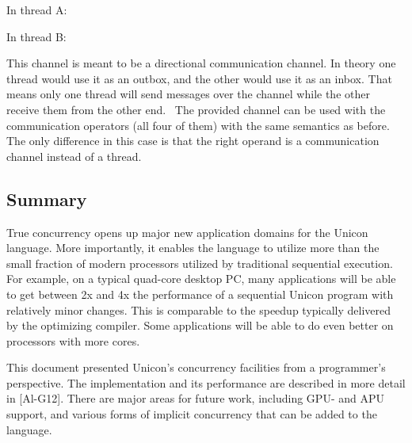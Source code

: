 In thread A:


In thread B:


This channel is meant to be a directional communication channel. In
theory one thread would use it as an outbox, and the other would use it
as an inbox. That means only one thread will send messages over the
channel while the other receive them from the other end. \ The provided
channel can be used with the communication operators (all four of them)
with the same semantics as before. The only difference in this case is
that the right operand is a communication channel instead of a thread.



\subsection*{Summary}

True concurrency opens up major new application domains for the Unicon
language. More importantly, it enables the language to utilize more
than the small fraction of modern processors utilized by traditional
sequential execution. For example, on a typical quad-core desktop PC,
many applications will be able to get between 2x and 4x the performance
of a sequential Unicon program with relatively minor changes. This is
comparable to the speedup typically delivered by the optimizing
compiler. Some applications will be able to do even better on
processors with more cores.

This document presented Unicon{\textquoteright}s concurrency facilities
from a programmer{\textquoteright}s perspective. The implementation and
its performance are described in more detail in [Al-G12]. There are major
areas for future work, including GPU- and APU support, and various
forms of implicit concurrency that can be added to the language.
